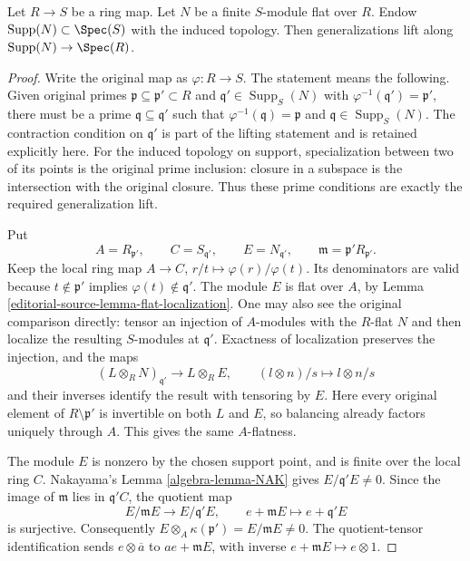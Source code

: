 \begin{lemma}
\label{editorial-source-lemma-going-down-flat-module}
Let $R \to S$ be a ring map. Let $N$ be a finite $S$-module flat over $R$.
Endow $\text{Supp}(N) \subset \Spec(S)$ with the induced topology.
Then generalizations lift along $\text{Supp}(N) \to \Spec(R)$.
\end{lemma}

\begin{proof}
Write the original map as $\varphi:R\to S$. The
statement means the following. Given original primes
$\mathfrak p\subseteq\mathfrak p'\subset R$ and
$\mathfrak q'\in\operatorname{Supp}_S(N)$ with
$\varphi^{-1}(\mathfrak q')=\mathfrak p'$, there
must be a prime $\mathfrak q\subseteq\mathfrak q'$
such that $\varphi^{-1}(\mathfrak q)=\mathfrak p$
and $\mathfrak q\in\operatorname{Supp}_S(N)$.
The contraction condition on $\mathfrak q'$ is
part of the lifting statement and is retained
explicitly here. For the induced topology on
support, specialization between two of its points
is the original prime inclusion: closure in a
subspace is the intersection with the original
closure. Thus these prime conditions are exactly
the required generalization lift.

Put
$$
A=R_{\mathfrak p'},\qquad C=S_{\mathfrak q'},
\qquad E=N_{\mathfrak q'},\qquad
\mathfrak m=\mathfrak p'R_{\mathfrak p'}.
$$
Keep the local ring map
$A\to C$, $r/t\mapsto\varphi(r)/\varphi(t)$.
Its denominators are valid because
$t\notin\mathfrak p'$ implies
$\varphi(t)\notin\mathfrak q'$.
The module $E$ is flat over $A$, by
Lemma \ref{editorial-source-lemma-flat-localization}. One may also
see the original comparison directly: tensor an
injection of $A$-modules with the $R$-flat $N$
and then localize the resulting $S$-modules at
$\mathfrak q'$. Exactness of localization preserves
the injection, and the maps
$$
(L\otimes_RN)_{\mathfrak q'}\longrightarrow L\otimes_RE,
\qquad (l\otimes n)/s\longmapsto l\otimes n/s
$$
and their inverses identify the result with
tensoring by $E$. Here every original element of
$R\setminus\mathfrak p'$ is invertible on both
$L$ and $E$, so balancing already factors uniquely
through $A$. This gives the same $A$-flatness.

The module $E$ is nonzero by the chosen support
point, and is finite over the local ring $C$.
Nakayama's Lemma \ref{algebra-lemma-NAK} gives
$E/\mathfrak q' E\ne0$. Since the image of
$\mathfrak m$ lies in $\mathfrak q'C$, the quotient
map
$$
E/\mathfrak mE\longrightarrow E/\mathfrak q'E,
\qquad e+\mathfrak mE\longmapsto e+\mathfrak q'E
$$
is surjective. Consequently
$E\otimes_A\kappa(\mathfrak p')=E/\mathfrak mE\ne0$.
The quotient-tensor identification sends
$e\otimes\overline a$ to $ae+\mathfrak mE$,
with inverse $e+\mathfrak mE\mapsto e\otimes1$.


\end{proof}
